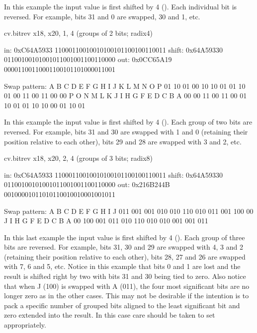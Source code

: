 \documentclass[letterpaper,10pt,english]{sphinxmanual}
\begin{document}
\sphinxAtStartPar
In this example the input value is first shifted by 4 (). Each individual
bit is reversed. For example, bits 31 and 0 are swapped, 30 and 1, etc.

\begin{sphinxVerbatim}[commandchars=\\\{\}]
cv.bitrev x18, x20, 1, 4 (groups of 2 bits; radix\PYGZhy{}4)

in:    0xC64A5933 11000110010010100101100100110011
shift: 0x64A59330 01100100101001011001001100110000
out:   0x0CC65A19 00001100110001100101101000011001

Swap pattern:
A  B  C  D  E  F  G  H  I  J  K  L  M  N  O  P
01 10 01 00 10 10 01 01 10 01 00 11 00 11 00 00
P  O  N  M  L  K  J  I  H  G  F  E  D  C  B  A
00 00 11 00 11 00 01 10 01 01 10 10 00 01 10 01
\end{sphinxVerbatim}

\sphinxAtStartPar
In this example the input value is first shifted by 4 (). Each group of
two bits are reversed. For example, bits 31 and 30 are swapped with 1 and 0
(retaining their position relative to each other), bits 29 and 28 are swapped
with 3 and 2, etc.

\begin{sphinxVerbatim}[commandchars=\\\{\}]
cv.bitrev x18, x20, 2, 4 (groups of 3 bits; radix\PYGZhy{}8)

in:    0xC64A5933 11000110010010100101100100110011
shift: 0x64A59330 01100100101001011001001100110000
out:   0x216B244B 00100001011010110010010001001011

Swap pattern:
A   B   C   D   E   F   G   H   I   J
011 001 001 010 010 110 010 011 001 100 00
   J   I   H   G   F   E   D   C   B   A
00 100 001 011 010 110 010 010 001 001 011
\end{sphinxVerbatim}

\sphinxAtStartPar
In this last example the input value is first shifted by 4 (). Each group
of three bits are reversed. For example, bits 31, 30 and 29 are swapped with
4, 3 and 2 (retaining their position relative to each other), bits 28, 27 and
26 are swapped with 7, 6 and 5, etc. Notice in this example that bits 0 and 1
are lost and the result is shifted right by two with bits 31 and 30 being tied
to zero. Also notice that when J (100) is swapped with A (011), the four most
significant bits are no longer zero as in the other cases. This may not be
desirable if the intention is to pack a specific number of grouped bits
aligned to the least significant bit and zero extended into the result. In
this case care should be taken to set  appropriately.
\end{document}
